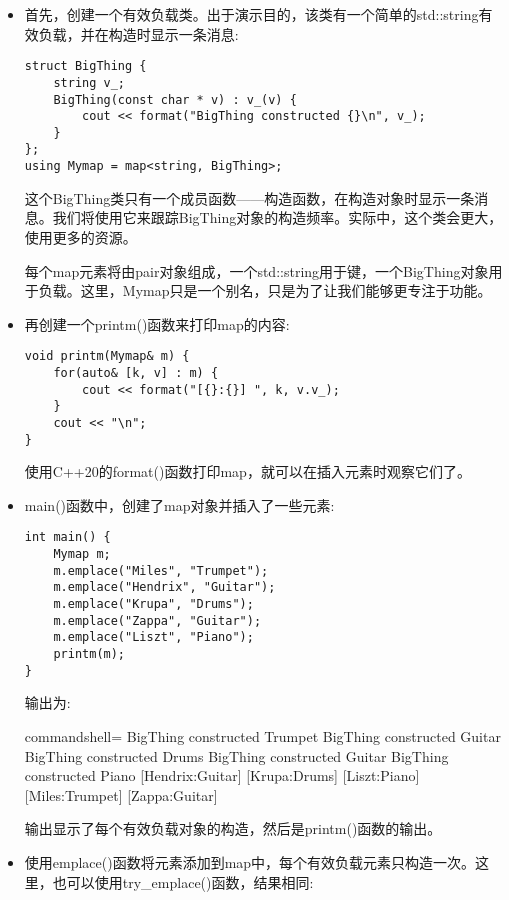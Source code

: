 \begin{itemize}
\item 
首先，创建一个有效负载类。出于演示目的，该类有一个简单的std::string有效负载，并在构造时显示一条消息:

\begin{lstlisting}[style=styleCXX]
struct BigThing {
	string v_;
	BigThing(const char * v) : v_(v) {
		cout << format("BigThing constructed {}\n", v_);
	}
};
using Mymap = map<string, BigThing>;
\end{lstlisting}

这个BigThing类只有一个成员函数——构造函数，在构造对象时显示一条消息。我们将使用它来跟踪BigThing对象的构造频率。实际中，这个类会更大，使用更多的资源。

每个map元素将由pair对象组成，一个std::string用于键，一个BigThing对象用于负载。这里，Mymap只是一个别名，只是为了让我们能够更专注于功能。

\item 
再创建一个printm()函数来打印map的内容:

\begin{lstlisting}[style=styleCXX]
void printm(Mymap& m) {
	for(auto& [k, v] : m) {
		cout << format("[{}:{}] ", k, v.v_);
	}
	cout << "\n";
}
\end{lstlisting}

使用C++20的format()函数打印map，就可以在插入元素时观察它们了。

\item 
main()函数中，创建了map对象并插入了一些元素:

\begin{lstlisting}[style=styleCXX]
int main() {
	Mymap m;
	m.emplace("Miles", "Trumpet");
	m.emplace("Hendrix", "Guitar");
	m.emplace("Krupa", "Drums");
	m.emplace("Zappa", "Guitar");
	m.emplace("Liszt", "Piano");
	printm(m);
}
\end{lstlisting}

输出为:

\begin{tcblisting}{commandshell={}}
BigThing constructed Trumpet
BigThing constructed Guitar
BigThing constructed Drums
BigThing constructed Guitar
BigThing constructed Piano
[Hendrix:Guitar] [Krupa:Drums] [Liszt:Piano]
[Miles:Trumpet] [Zappa:Guitar]
\end{tcblisting}

输出显示了每个有效负载对象的构造，然后是printm()函数的输出。

\item 
使用emplace()函数将元素添加到map中，每个有效负载元素只构造一次。这里，也可以使用try\_emplace()函数，结果相同:


\end{itemize}
